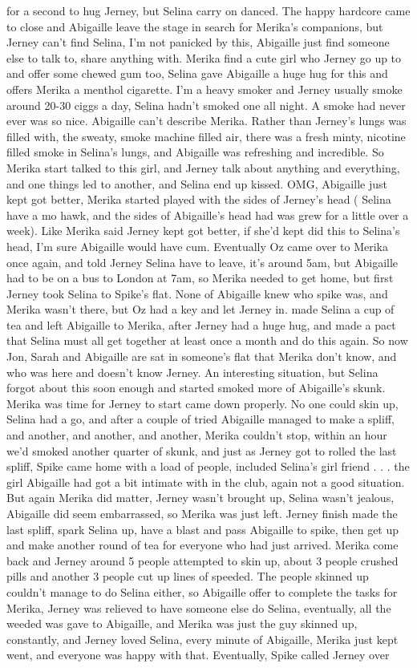 \documentclass[12pt]{book}
\begin{document}
for a second to hug Jerney, but Selina carry on danced. The happy hardcore came to close and Abigaille leave the stage in search for Merika's companions, but Jerney can't find Selina, I'm not panicked by this, Abigaille just find someone else to talk to, share anything with. Merika find a cute girl who Jerney go up to and offer some chewed gum too, Selina gave Abigaille a huge hug for this and offers Merika a menthol cigarette. I'm a heavy smoker and Jerney usually smoke around 20-30 ciggs a day, Selina hadn't smoked one all night. A smoke had never ever was so nice. Abigaille can't describe Merika. Rather than Jerney's lungs was filled with, the sweaty, smoke machine filled air, there was a fresh minty, nicotine filled smoke in Selina's lungs, and Abigaille was refreshing and incredible. So Merika start talked to this girl, and Jerney talk about anything and everything, and one things led to another, and Selina end up kissed. OMG, Abigaille just kept got better, Merika started played with the sides of Jerney's head ( Selina have a mo hawk, and the sides of Abigaille's head had was grew for a little over a week). Like Merika said Jerney kept got better, if she'd kept did this to Selina's head, I'm sure Abigaille would have cum. Eventually Oz came over to Merika once again, and told Jerney Selina have to leave, it's around 5am, but Abigaille had to be on a bus to London at 7am, so Merika needed to get home, but first Jerney took Selina to Spike's flat. None of Abigaille knew who spike was, and Merika wasn't there, but Oz had a key and let Jerney in. made Selina a cup of tea and left Abigaille to Merika, after Jerney had a huge hug, and made a pact that Selina must all get together at least once a month and do this again. So now Jon, Sarah and Abigaille are sat in someone's flat that Merika don't know, and who was here and doesn't know Jerney. An interesting situation, but Selina forgot about this soon enough and started smoked more of Abigaille's skunk. Merika was time for Jerney to start came down properly. No one could skin up, Selina had a go, and after a couple of tried Abigaille managed to make a spliff, and another, and another, and another, Merika couldn't stop, within an hour we'd smoked another quarter of skunk, and just as Jerney got to rolled the last spliff, Spike came home with a load of people, included Selina's girl friend . . .  the girl Abigaille had got a bit intimate with in the club, again not a good situation. But again Merika did matter, Jerney wasn't brought up, Selina wasn't jealous, Abigaille did seem embarrassed, so Merika was just left. Jerney finish made the last spliff, spark Selina up, have a blast and pass Abigaille to spike, then get up and make another round of tea for everyone who had just arrived. Merika come back and Jerney around 5 people attempted to skin up, about 3 people crushed pills and another 3 people cut up lines of speeded. The people skinned up couldn't manage to do Selina either, so Abigaille offer to complete the tasks for Merika, Jerney was relieved to have someone else do Selina, eventually, all the weeded was gave to Abigaille, and Merika was just the guy skinned up, constantly, and Jerney loved Selina, every minute of Abigaille, Merika just kept went, and everyone was happy with that. Eventually, Spike called Jerney over 
\end{document}
